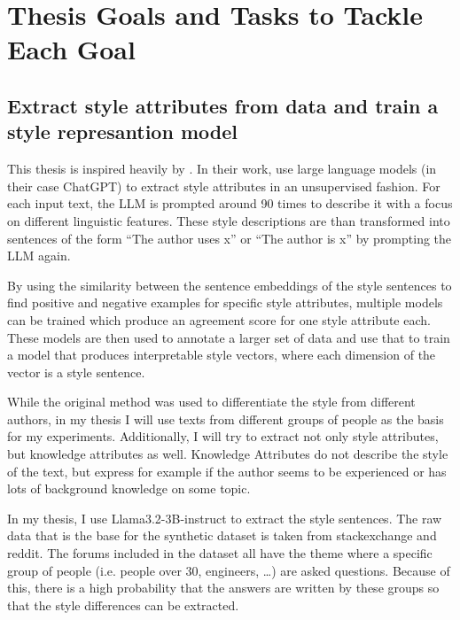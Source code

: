 
\section{Thesis Goals and Tasks to Tackle Each Goal}
  \subsection{Extract style attributes from data and train a style represantion model}
  This thesis is inspired heavily by \citet{patelLearningInterpretableStyle2023}. In their work, \citeauthor{patelLearningInterpretableStyle2023} use large language models (in their case ChatGPT) to extract style attributes in an unsupervised fashion. For each input text, the LLM is prompted around 90 times to describe it with a focus on different linguistic features. These style descriptions are than transformed into sentences of the form \enquote{The author uses x} or \enquote{The author is x} by prompting the LLM again.

  By using the similarity between the sentence embeddings of the style sentences to find positive and negative examples for specific style attributes, multiple models can be trained which produce an agreement score for one style attribute each. These models are then used to annotate a larger set of data and use that to train a model that produces interpretable style vectors, where each dimension of the vector is a style sentence.
  
  While the original method was used to differentiate the style from different authors, in my thesis I will use texts from different groups of people as the basis for my experiments. Additionally, I will try to extract not only style attributes, but knowledge attributes as well. Knowledge Attributes do not describe the style of the text, but express for example if the author seems to be experienced or has lots of background knowledge on some topic.
  
  In my thesis, I use Llama3.2-3B-instruct %
  to extract the style sentences. The raw data that is the base for the synthetic dataset is taken from stackexchange and reddit. The forums included in the dataset all have the theme where a specific group of people (i.e. people over 30, engineers, \ldots) are asked questions. Because of this, there is a high probability that the answers are written by these groups so that the style differences can be extracted.

